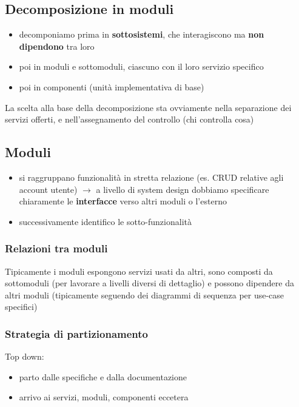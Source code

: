 \subsection{Decomposizione in moduli}

\begin{itemize}
  \item decomponiamo prima in \textbf{sottosistemi}, che interagiscono ma \textbf{non dipendono} tra loro
  \item poi in moduli e sottomoduli, ciascuno con il loro servizio specifico
  \item poi in componenti (unit\`a implementativa di base)
\end{itemize}

La scelta alla base della decomposizione sta ovviamente nella separazione dei servizi offerti, e nell'assegnamento del controllo (chi controlla cosa)

\subsection{Moduli}
\begin{itemize}
  \item si raggruppano funzionalit\`a in stretta relazione (es. CRUD relative agli account utente) $\rightarrow$ a livello di system design dobbiamo specificare chiaramente le \textbf{interfacce} verso altri moduli o l'esterno
  \item successivamente identifico le sotto-funzionalit\`a
\end{itemize}

\subsubsection{Relazioni tra moduli}

Tipicamente i moduli espongono servizi usati da altri, sono composti da sottomoduli (per lavorare a livelli diversi di dettaglio) e possono dipendere da altri moduli (tipicamente seguendo dei diagrammi di sequenza per use-case specifici)

\subsubsection{Strategia di partizionamento}

Top down:
\begin{itemize}
  \item parto dalle specifiche e dalla documentazione
  \item arrivo ai servizi, moduli, componenti eccetera
\end{itemize}

